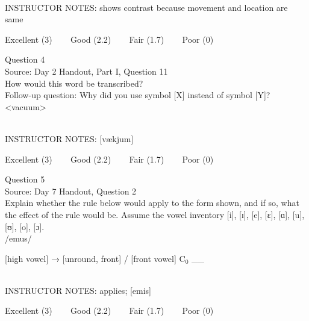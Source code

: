 \documentclass[12pt]{article}
\begin{document}
~\\
INSTRUCTOR NOTES: shows contrast because movement and location are same


\vfill
Excellent (3) ~~~ Good (2.2) ~~~ Fair (1.7) ~~~ Poor (0)
\newpage

{\large Question 4}\\

Source: Day 2 Handout, Part I, Question 11\\

How would this word be transcribed?\\ Follow-up question: Why did you use symbol [X] instead of symbol [Y]?\\

<vacuum>


~\\
INSTRUCTOR NOTES: [vækjum]


\vfill
Excellent (3) ~~~ Good (2.2) ~~~ Fair (1.7) ~~~ Poor (0)
\newpage

{\large Question 5}\\

Source: Day 7 Handout, Question 2\\

Explain whether the rule below would apply to the form shown, and if so, what the effect of the rule would be. Assume the vowel inventory [i], [ɪ], [e], [ɛ], [ɑ], [u], [ʊ], [o], [ɔ].\\

/emus/

{[high vowel]} →  {[unround, front]} / {[front vowel]} C$_0$ \_\_ 


~\\
INSTRUCTOR NOTES: applies; [emis]


\vfill
Excellent (3) ~~~ Good (2.2) ~~~ Fair (1.7) ~~~ Poor (0)
\newpage

\begin{center}
\textbf{{\color{red}{\HUGE END OF EXAM}}}\\

\end{center}
\newpage

\begin{center}
\textbf{{\color{blue}{\HUGE START OF EXAM\\}}}

\textbf{{\color{blue}{\HUGE Student ID: 8951\\}}}

\textbf{{\color{blue}{\HUGE 1:00 - 1:15 PM\\}}}

\end{center}
\newpage
\end{document}
